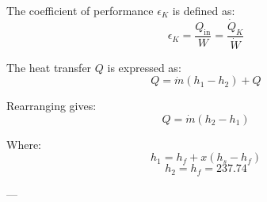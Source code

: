 The coefficient of performance \( \epsilon_K \) is defined as:  
\[
\epsilon_K = \frac{Q_{\text{in}}}{W} = \frac{\dot{Q}_K}{\dot{W}}
\]

The heat transfer \( Q \) is expressed as:  
\[
Q = \dot{m} (h_1 - h_2) + Q
\]

Rearranging gives:  
\[
Q = \dot{m} (h_2 - h_1)
\]

Where:  
\[
h_1 = h_f + x (h_s - h_f)
\]
\[
h_2 = h_f = 237.74
\]

---